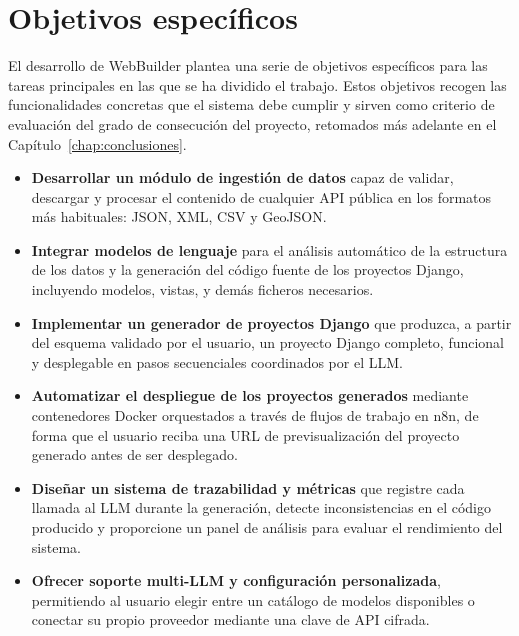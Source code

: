 \section{Objetivos específicos}
\label{sec:objetivos-especificos}

El desarrollo de WebBuilder plantea una serie de objetivos específicos para las tareas principales en las que se ha dividido el trabajo. Estos objetivos recogen las funcionalidades concretas que el sistema debe cumplir y sirven como criterio de evaluación del grado de consecución del proyecto, retomados más adelante en el Capítulo~\ref{chap:conclusiones}.

\begin{itemize}
	\item \textbf{Desarrollar un módulo de ingestión de datos} capaz de validar, descargar y procesar el contenido de cualquier API pública en los formatos más habituales: JSON, XML, CSV y GeoJSON.
	
	\item \textbf{Integrar modelos de lenguaje} para el análisis automático de la estructura de los datos y la generación del código fuente de los proyectos Django, incluyendo modelos, vistas, y demás ficheros necesarios.
	
	\item \textbf{Implementar un generador de proyectos Django} que produzca, a partir del esquema validado por el usuario, un proyecto Django completo, funcional y desplegable en pasos secuenciales coordinados por el LLM.
	
	\item \textbf{Automatizar el despliegue de los proyectos generados} mediante contenedores Docker orquestados a través de flujos de trabajo en n8n, de forma que el usuario reciba una URL de previsualización del proyecto generado antes de ser desplegado.
	
	\item \textbf{Diseñar un sistema de trazabilidad y métricas} que registre cada llamada al LLM durante la generación, detecte inconsistencias en el código producido y proporcione un panel de análisis para evaluar el rendimiento del sistema.
	
	\item \textbf{Ofrecer soporte multi-LLM y configuración personalizada}, permitiendo al usuario elegir entre un catálogo de modelos disponibles o conectar su propio proveedor mediante una clave de API cifrada.
\end{itemize}

